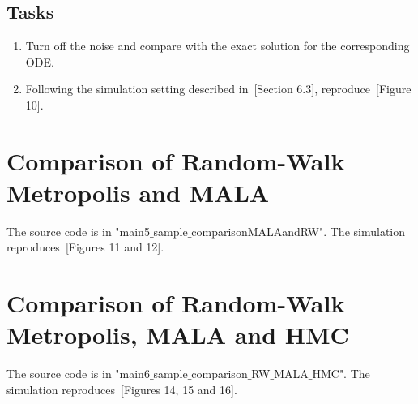 \documentclass{scrartcl}
\begin{document}
\subsection{Tasks}
\begin{enumerate}
\item Turn off the noise and compare with the exact solution for the corresponding ODE. 
\item Following the simulation setting described in~\cite{sanz2014markov}[Section 6.3], reproduce~\cite{sanz2014markov}[Figure 10].
\end{enumerate}


\section{Comparison of Random-Walk Metropolis and MALA}

The source code is in "main5$\_$sample$\_$comparisonMALAandRW". The simulation reproduces~\cite{sanz2014markov}[Figures 11 and 12]. 

\section{Comparison of Random-Walk Metropolis, MALA and HMC}

The source code is in "main6$\_$sample$\_$comparison$\_$RW$\_$MALA$\_$HMC". The simulation reproduces~\cite{sanz2014markov}[Figures 14, 15 and 16]. 

\newpage






	
    
\end{document}
